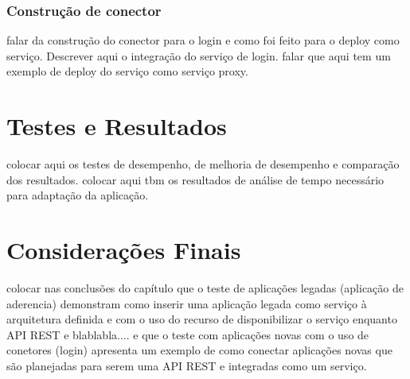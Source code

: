\subsubsection{Construção de conector}
falar da construção do conector para o login e como foi feito para o deploy como serviço.
Descrever aqui o integração do serviço de login. falar que aqui tem um exemplo de deploy do serviço como serviço proxy.


\section{Testes e Resultados}
colocar aqui os testes de desempenho, de melhoria de desempenho e comparação dos resultados. 
colocar aqui tbm os resultados de análise de tempo necessário para adaptação da aplicação.

\section{Considerações Finais}
colocar nas conclusões do capítulo que o teste de aplicações legadas (aplicação de aderencia) demonstram como inserir uma aplicação legada como serviço à arquitetura definida e com o uso do recurso de disponibilizar o serviço enquanto API REST  e blablabla.... e que o teste com aplicações novas com o uso de conetores (login) apresenta um exemplo de como conectar aplicações novas que são planejadas para serem uma API REST e integradas como um serviço.